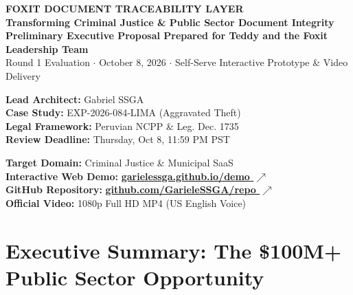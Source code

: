 \documentclass[11pt,a4paper]{article}
\begin{document}
\begin{center}
    {\LARGE \textbf{\color{SlateDark}FOXIT DOCUMENT TRACEABILITY LAYER}}\\[5pt]
    {\large \textbf{\color{FoxitOrange}Transforming Criminal Justice \& Public Sector Document Integrity}}\\[8pt]
    {\textbf{\color{SlateDark}Preliminary Executive Proposal Prepared for Teddy and the Foxit Leadership Team}}\\[3pt]
    {\small \color{SlateGray} Round 1 Evaluation $\cdot$ October 8, 2026 $\cdot$ Self-Serve Interactive Prototype \& Video Delivery}
\end{center}

\begin{executivebox}
\noindent
\begin{minipage}[t]{0.48\textwidth}\raggedright
  \textbf{Lead Architect:} Gabriel SSGA\\[4pt]
  \textbf{Case Study:} EXP-2026-084-LIMA (Aggravated Theft)\\[4pt]
  \textbf{Legal Framework:} Peruvian NCPP \& Leg. Dec. 1735\\[4pt]
  \textbf{Review Deadline:} Thursday, Oct 8, 11:59 PM PST
\end{minipage}\hfill
\begin{minipage}[t]{0.48\textwidth}\raggedright
  \textbf{Target Domain:} Criminal Justice \& Municipal SaaS\\[4pt]
  \textbf{Interactive Web Demo:} \href{https://garielessga.github.io/FOXIT-CAPA-RAZABILIDAD/}{\color{FoxitOrange}\textbf{garielessga.github.io/demo $\nearrow$}}\\[4pt]
  \textbf{GitHub Repository:} \href{https://github.com/GarieleSSGA/FOXIT-CAPA-RAZABILIDAD}{\color{FoxitOrange}\textbf{github.com/GarieleSSGA/repo $\nearrow$}}\\[4pt]
  \textbf{Official Video:} 1080p Full HD MP4 (US English Voice)
\end{minipage}
\end{executivebox}

\section{Executive Summary: The \$100M+ Public Sector Opportunity}
\end{document}
